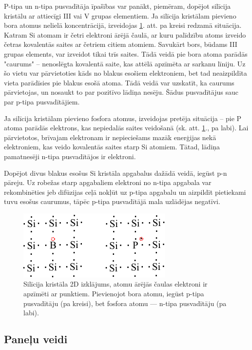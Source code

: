 P-tipa un n-tipa pusvadītāja īpašības var panākt, piemēram, dopējot silīcija kristālu ar attiecīgi III vai V grupas elementiem. Ja silīcija kristālam pievieno bora atomus nelielā koncentrācijā, izveidojas \ref{fig:p-n-type}. att. pa kreisi redzamā situācija. Katram Si atomam ir četri elektroni ārējā čaulā, ar kuru palīdzību atoms izveido četras kovalentās saites ar četriem citiem atomiem. Savukārt bors, būdams III grupas elements, var izveidot tikai trīs saites. Tādā veidā pie bora atoma parādās "caurums" -- nenoslēgta kovalentā saite, kas attēlā apzīmēta ar sarkanu līniju. Uz šo vietu var pārvietoties kāds no blakus esošiem elektroniem, bet tad neaizpildīta vieta parādīsies pie blakus esošā atoma. Tādā veidā var uzskatīt, ka caurums pārvietojas, un nosaukt to par pozitīvo lādiņa nesēju. Šādus pusvadītājus sauc par p-tipa pusvadītājiem. ~\cite{Yahyaoui}

Ja silīcija kristālam pievieno fosfora atomus, izveidojas pretēja situācija -- pie P atoma parādās elektrons, kas nepiedalās saites veidošanā (sk. att. \ref{fig:p-n-type}., pa labi). Lai pārvietotos, brīvajam elektronam ir nepieciešams mazāk enerģijas nekā elektroniem, kas veido kovalentās saites starp Si atomiem. Tātad, lādiņa pamatnesēji n-tipa pusvadītājos ir elektroni.

Dopējot divus blakus esošus Si kristāla apgabalus dažādā veidā, iegūst p-n pāreju. Uz robežas starp apgabaliem elektroni no n-tipa apgabala var rekombinēties jeb difūzijas ceļā nokļūt uz p-tipa apgabalu un aizpildīt pietiekami tuvu esošus caurumus, tāpēc p-tipa pusvadītājā mala uzlādējas negatīvi.

\begin{figure}[h]
	\centering
	\includegraphics[width=0.5\linewidth]{figures/misc/p_n_type.pdf}
	\caption{Silīcija kristāla 2D izklājums, atomu ārējās čaulas elektroni ir apzīmēti ar punktiem. Pievienojot bora atomu, iegūst p-tipa pusvadītāju (pa kreisi), bet fosfora atomu --- n-tipa pusvadītāju (pa labi).}
	\label{fig:p-n-type}
\end{figure}


\subsection{Paneļu veidi}

